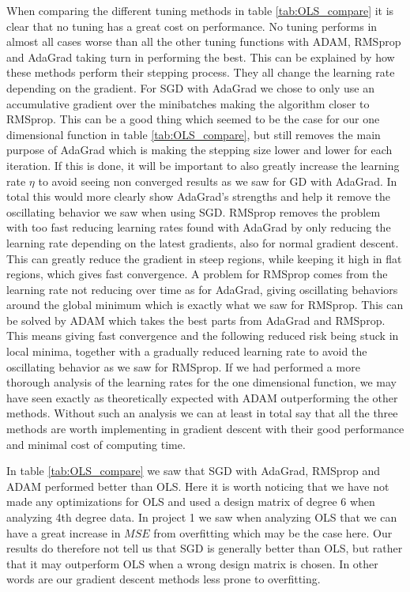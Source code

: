\documentclass[11pt]{article}
\begin{document}
When comparing the different tuning methods in table \ref{tab:OLS_compare} it is clear that no tuning has a great cost on performance. No tuning performs in almost all cases worse than all the other tuning functions with ADAM, RMSprop and AdaGrad taking turn in performing the best. This can be explained by how these methods perform their stepping process. They all change the learning rate depending on the gradient. For SGD with AdaGrad we chose to only use an accumulative gradient over the minibatches making the algorithm closer to RMSprop. This can be a good thing which seemed to be the case for our one dimensional function in table \ref{tab:OLS_compare}, but still removes the main purpose of AdaGrad which is making the stepping size lower and lower for each iteration. If this is done, it will be important to also greatly increase the learning rate $\eta$ to avoid seeing non converged results as we saw for GD with AdaGrad. In total this would more clearly show AdaGrad's strengths and help it remove the oscillating behavior we saw when using SGD. RMSprop removes the problem with too fast reducing learning rates found with AdaGrad by only reducing the learning rate depending on the latest gradients, also for normal gradient descent. This can greatly reduce the gradient in steep regions, while keeping it high in flat regions, which gives fast convergence. A problem for RMSprop comes from the learning rate not reducing over time as for AdaGrad, giving oscillating behaviors around the global minimum which is exactly what we saw for RMSprop. This can be solved by ADAM which takes the best parts from AdaGrad and RMSprop. This means giving fast convergence and the following reduced risk being stuck in local minima, together with a gradually reduced learning rate to avoid the oscillating behavior as we saw for RMSprop. If we had performed a more thorough analysis of the learning rates for the one dimensional function, we may have seen exactly as theoretically expected with ADAM outperforming the other methods. Without such an analysis we can at least in total say that all the three methods are worth implementing in gradient descent with their good performance and minimal cost of computing time.

In table \ref{tab:OLS_compare} we saw that SGD with AdaGrad, RMSprop and ADAM performed better than OLS. Here it is worth noticing that we have not made any optimizations for OLS and used a design matrix of degree 6 when analyzing 4th degree data. In project 1 \cite{project1} we saw when analyzing OLS that we can have a great increase in $MSE$ from overfitting which may be the case here. Our results do therefore not tell us that SGD is generally better than OLS, but rather that it may outperform OLS when a wrong design matrix is chosen. In other words are our gradient descent methods less prone to overfitting.
\end{document}
